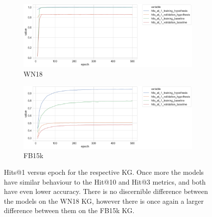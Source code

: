 
\begin{figure}[H]
	\begin{subfigure}[b]{.5\linewidth}
   		\centering
    		\includegraphics[width=1.0\linewidth, height=0.6\linewidth]{WN18_hits_at_1_Results}
		\captionsetup{justification=centering}
		\caption{WN18}
	\end{subfigure}
	\begin{subfigure}[b]{.5\linewidth}
   		\centering
		\includegraphics[width=1.0\linewidth, height=0.6\linewidth]{FB15k_hits_at_1_Results}
		\captionsetup{justification=centering}
		\caption{FB15k}
	\end{subfigure}
	\caption{Hits@1 versus epoch for the respective KG. Once more the models have similar behaviour to the Hit@10 and Hit@3 metrics, and both have even lower accuracy. There is no discernible difference between the models on the WN18 KG, however there is once again a larger difference between them on the FB15k KG. }
\end{figure}

